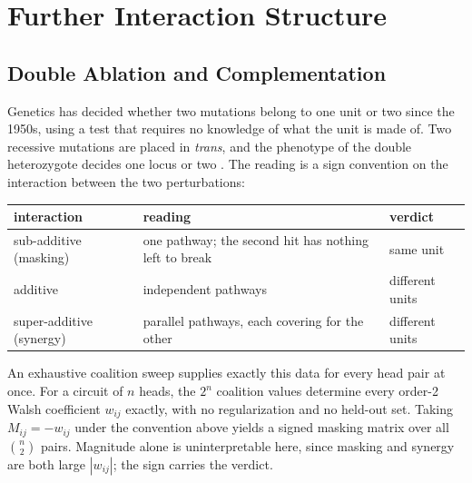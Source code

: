 \documentclass{article}
\begin{document}
%


\section{Further Interaction Structure}


\subsection{Double Ablation and Complementation}

Genetics has decided whether two mutations belong to one unit or two since the 1950s, using
a test that requires no knowledge of what the unit is made of. Two recessive mutations are
placed in \emph{trans}, and the phenotype of the double heterozygote decides one locus or
two \citep{benzer1955}. The reading is a sign convention on the interaction between the two
perturbations:

\begin{center}
\begin{tabular}{lll}
\toprule
interaction & reading & verdict \\
\midrule
sub-additive (masking) & one pathway; the second hit has nothing left to break & same unit \\
additive & independent pathways & different units \\
super-additive (synergy) & parallel pathways, each covering for the other & different units \\
\bottomrule
\end{tabular}
\end{center}

An exhaustive coalition sweep supplies exactly this data for every head pair at once. For a
circuit of $n$ heads, the $2^n$ coalition values determine every order-2 Walsh coefficient
$w_{ij}$ exactly, with no regularization and no held-out set. Taking $M_{ij} = -w_{ij}$
under the convention above yields a signed masking matrix over all $\binom{n}{2}$ pairs.
Magnitude alone is uninterpretable here, since masking and synergy are both large
$|w_{ij}|$; the sign carries the verdict.
\end{document}
